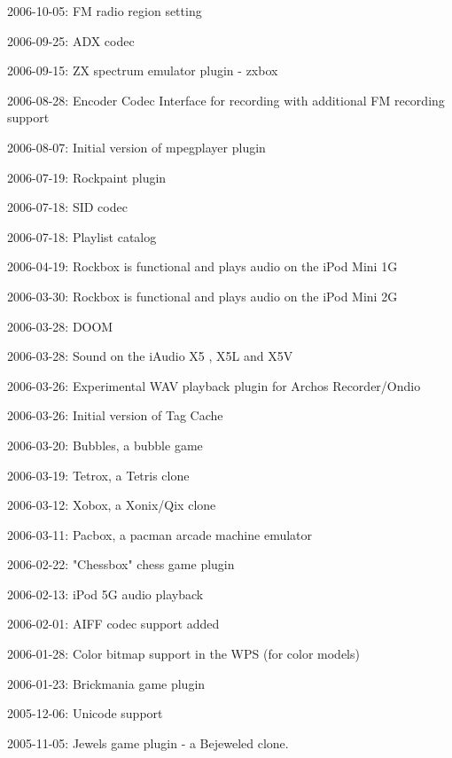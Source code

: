 \begin{changelog}
\item 2006-10-05: FM radio region setting
\item 2006-09-25: ADX codec
\item 2006-09-15: ZX spectrum emulator plugin - zxbox
\item 2006-08-28: Encoder Codec Interface for recording with
  additional FM recording support
\item 2006-08-07: Initial version of mpegplayer plugin
\item 2006-07-19: Rockpaint plugin
\item 2006-07-18: SID codec
\item 2006-07-18: Playlist catalog
\item 2006-04-19: Rockbox is functional and plays audio on the iPod Mini 1G
\item 2006-03-30: Rockbox is functional and plays audio on the iPod Mini 2G
\item 2006-03-28: DOOM
\item 2006-03-28: Sound on the iAudio X5 , X5L and X5V
\item 2006-03-26: Experimental WAV playback plugin for Archos Recorder/Ondio
\item 2006-03-26: Initial version of Tag Cache
\item 2006-03-20: Bubbles, a bubble game
\item 2006-03-19: Tetrox, a Tetris clone
\item 2006-03-12: Xobox, a Xonix/Qix clone
\item 2006-03-11: Pacbox, a pacman arcade machine emulator
\item 2006-02-22: "Chessbox" chess game plugin
\item 2006-02-13: iPod 5G audio playback
\item 2006-02-01: AIFF codec support added
\item 2006-01-28: Color bitmap support in the WPS (for color models)
\item 2006-01-23: Brickmania game plugin
\item 2005-12-06: Unicode support
\item 2005-11-05: Jewels game plugin - a Bejeweled clone.
\end{changelog}

